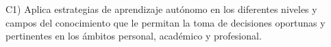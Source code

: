 C1) Aplica estrategias de aprendizaje aut\'{o}nomo en los diferentes
niveles y campos del conocimiento que le permitan la toma de
decisiones oportunas y pertinentes en los \'{a}mbitos personal,
acad\'{e}mico y profesional.

